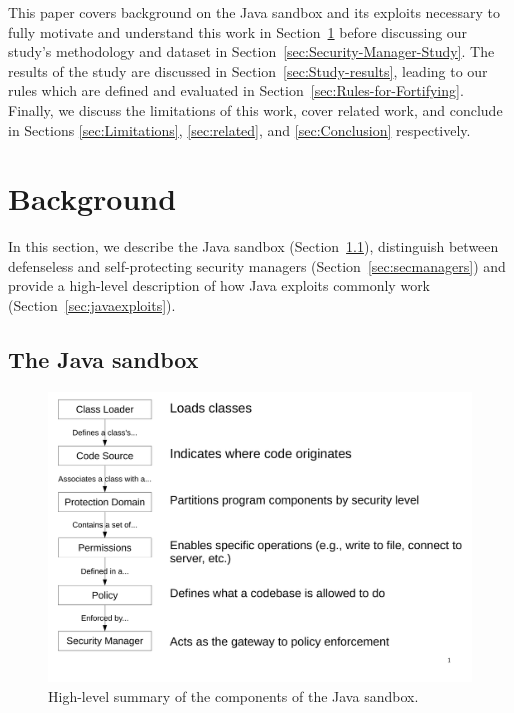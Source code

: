 \documentclass{sig-alternate}
\begin{document}
This paper covers background on the Java sandbox and its exploits necessary to fully motivate and understand this work in Section~\ref{sec:Background} before discussing our study's methodology and dataset in Section~\ref{sec:Security-Manager-Study}. The results of the study are discussed in Section~\ref{sec:Study-results}, leading to our rules which are defined and evaluated in Section~\ref{sec:Rules-for-Fortifying}. Finally, we discuss the limitations of this work, cover related work, and conclude in Sections \ref{sec:Limitations}, \ref{sec:related}, and \ref{sec:Conclusion} respectively.

\section{Background}\label{sec:Background}

In this section, we describe the Java sandbox
(Section~\ref{sec:sandbox}), distinguish between defenseless and self-protecting
security managers (Section~\ref{sec:secmanagers}) and provide a high-level
description of how Java exploits commonly work
(Section~\ref{sec:javaexploits}). 

\subsection{The Java sandbox}
\label{sec:sandbox}

\begin{figure}
\includegraphics[width=\columnwidth]{sandbox_overview}
\caption{High-level summary of the components of the Java 
\label{fig:Sandbox-high-level-summary}
sandbox.}
\end{figure}
\end{document}
